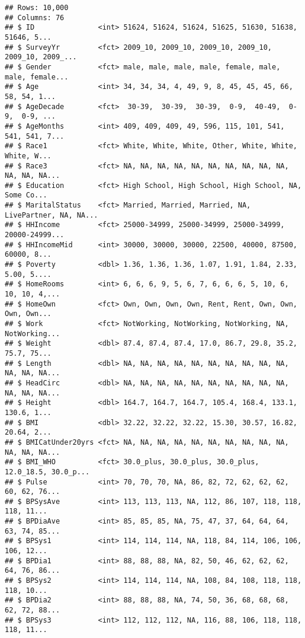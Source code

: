 \documentclass[
]{article}
\begin{document}
\begin{verbatim}
## Rows: 10,000
## Columns: 76
## $ ID               <int> 51624, 51624, 51624, 51625, 51630, 51638, 51646, 5...
## $ SurveyYr         <fct> 2009_10, 2009_10, 2009_10, 2009_10, 2009_10, 2009_...
## $ Gender           <fct> male, male, male, male, female, male, male, female...
## $ Age              <int> 34, 34, 34, 4, 49, 9, 8, 45, 45, 45, 66, 58, 54, 1...
## $ AgeDecade        <fct>  30-39,  30-39,  30-39,  0-9,  40-49,  0-9,  0-9, ...
## $ AgeMonths        <int> 409, 409, 409, 49, 596, 115, 101, 541, 541, 541, 7...
## $ Race1            <fct> White, White, White, Other, White, White, White, W...
## $ Race3            <fct> NA, NA, NA, NA, NA, NA, NA, NA, NA, NA, NA, NA, NA...
## $ Education        <fct> High School, High School, High School, NA, Some Co...
## $ MaritalStatus    <fct> Married, Married, Married, NA, LivePartner, NA, NA...
## $ HHIncome         <fct> 25000-34999, 25000-34999, 25000-34999, 20000-24999...
## $ HHIncomeMid      <int> 30000, 30000, 30000, 22500, 40000, 87500, 60000, 8...
## $ Poverty          <dbl> 1.36, 1.36, 1.36, 1.07, 1.91, 1.84, 2.33, 5.00, 5....
## $ HomeRooms        <int> 6, 6, 6, 9, 5, 6, 7, 6, 6, 6, 5, 10, 6, 10, 10, 4,...
## $ HomeOwn          <fct> Own, Own, Own, Own, Rent, Rent, Own, Own, Own, Own...
## $ Work             <fct> NotWorking, NotWorking, NotWorking, NA, NotWorking...
## $ Weight           <dbl> 87.4, 87.4, 87.4, 17.0, 86.7, 29.8, 35.2, 75.7, 75...
## $ Length           <dbl> NA, NA, NA, NA, NA, NA, NA, NA, NA, NA, NA, NA, NA...
## $ HeadCirc         <dbl> NA, NA, NA, NA, NA, NA, NA, NA, NA, NA, NA, NA, NA...
## $ Height           <dbl> 164.7, 164.7, 164.7, 105.4, 168.4, 133.1, 130.6, 1...
## $ BMI              <dbl> 32.22, 32.22, 32.22, 15.30, 30.57, 16.82, 20.64, 2...
## $ BMICatUnder20yrs <fct> NA, NA, NA, NA, NA, NA, NA, NA, NA, NA, NA, NA, NA...
## $ BMI_WHO          <fct> 30.0_plus, 30.0_plus, 30.0_plus, 12.0_18.5, 30.0_p...
## $ Pulse            <int> 70, 70, 70, NA, 86, 82, 72, 62, 62, 62, 60, 62, 76...
## $ BPSysAve         <int> 113, 113, 113, NA, 112, 86, 107, 118, 118, 118, 11...
## $ BPDiaAve         <int> 85, 85, 85, NA, 75, 47, 37, 64, 64, 64, 63, 74, 85...
## $ BPSys1           <int> 114, 114, 114, NA, 118, 84, 114, 106, 106, 106, 12...
## $ BPDia1           <int> 88, 88, 88, NA, 82, 50, 46, 62, 62, 62, 64, 76, 86...
## $ BPSys2           <int> 114, 114, 114, NA, 108, 84, 108, 118, 118, 118, 10...
## $ BPDia2           <int> 88, 88, 88, NA, 74, 50, 36, 68, 68, 68, 62, 72, 88...
## $ BPSys3           <int> 112, 112, 112, NA, 116, 88, 106, 118, 118, 118, 11...

\end{verbatim}
\end{document}
